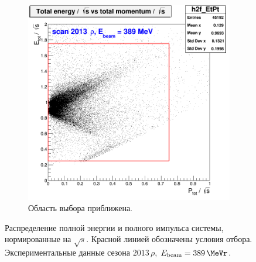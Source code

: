 \begin{figure}[htbp]
\begin{subfigure}[b]{0.45\textwidth}
        \includegraphics[width=\textwidth]{img/h2f_EtPt_zoom.png}
        \caption{Область выбора приближена.}\label{fig:3pi_EtPt_zoom}
    \end{subfigure}
    \caption{Распределение полной энергии и полного импульса системы,
        нормированные на $\sqrt{s}$.
        Красной линией обозначены условия отбора.
        Экспериментальные данные сезона $2013 \, \rho$,
        $E_{\text{beam}} = \SI{389}{\MeVr}$.}\label{fig:3pi_EtPt}
\end{figure}

